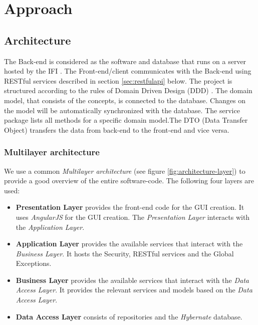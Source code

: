 \chapter{Approach}

\section{Architecture}

The Back-end is considered as the software and database that runs on a server hosted by the IFI \cite{ifi}. The Front-end/client communicates with the Back-end using RESTful services described in section \ref{sec:restfulapi} below.\newline
The project is structured according to the rules of Domain Driven Design (DDD) \cite{ddd}. The domain model, that consists of the concepts, is connected to the database. Changes on the model will be automatically synchronized with the database. The service package lists all methods for a specific domain model.\newline The DTO (Data Transfer Object) transfers the data from back-end to the front-end and vice versa.

\subsection{Multilayer architecture}
We use a common \textit{Multilayer architecture} (see figure \ref{fig:architecture-layer}) to provide a good overview of the entire software-code. The following four layers are used:
\begin{itemize}
    \item \textbf{Presentation Layer} provides the front-end code for the GUI creation. It uses \textit{AngularJS} for the GUI creation. The \textit{Presentation Layer} interacts with the \textit{Application Layer}.
    \item \textbf{Application Layer} provides the available services that interact with the \textit{Business Layer}. It hosts the Security, RESTful services and the Global Exceptions.
    \item \textbf{Business Layer} provides the available services that interact with the \textit{Data Access Layer}. It provides the relevant services and models based on the \textit{Data Access Layer}.
    \item \textbf{Data Access Layer} consists of repositories and the \textit{Hybernate} database. 
\end{itemize}



